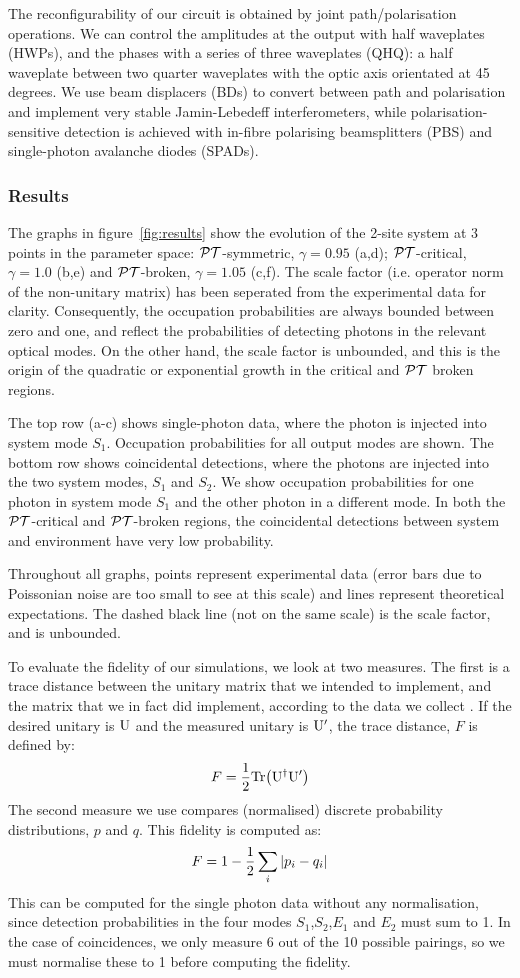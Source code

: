 The reconfigurability of our circuit is obtained by joint path/polarisation
operations. We can control the amplitudes at the output with half waveplates
(HWPs), and the phases with a series of three waveplates (QHQ): a half waveplate
between two quarter waveplates with the optic axis orientated at 45 degrees.
We use beam displacers (BDs) to convert between path and polarisation and
implement very stable Jamin-Lebedeff interferometers, while
polarisation-sensitive detection is achieved with in-fibre polarising
beamsplitters (PBS) and single-photon avalanche diodes (SPADs).

\subsubsection{Results}
The graphs in figure~\ref{fig:results} show the evolution of the 2-site system
at 3 points in the parameter space: \(\mathcal{PT}\)-symmetric, \(\gamma=0.95\) (a,d);
\(\mathcal{PT}\)-critical, \(\gamma=1.0\) (b,e) and \(\mathcal{PT}\)-broken, \(\gamma=1.05\)
(c,f). The scale factor (i.e. operator norm of the non-unitary matrix) has been
seperated from the experimental data for clarity. Consequently, the occupation
probabilities are always bounded between zero and one, and reflect the
probabilities of detecting photons in the relevant optical modes. On the other
hand, the scale factor is unbounded, and this is the origin of the quadratic or
exponential growth in the critical and \(\mathcal{PT}\) broken regions.

The top row (a-c) shows single-photon data, where the photon is injected into
system mode \(S_1\). Occupation probabilities for all output modes are shown.
The bottom row shows coincidental detections, where the photons are injected
into the two system modes, \(S_1\) and \(S_2\). We show occupation probabilities
for one photon in system mode \(S_1\) and the other photon in a different mode.
In both the \(\mathcal{PT}\)-critical and \(\mathcal{PT}\)-broken regions, the coincidental
detections between system and environment have very low probability.

Throughout all graphs, points represent experimental data (error bars due to
Poissonian noise are too small to see at this scale) and lines represent
theoretical expectations. The dashed black line (not on the same scale) is the
scale factor, and is unbounded.

To evaluate the fidelity of our simulations, we look at two measures. The first
is a trace distance between the unitary matrix that we intended to implement,
and the matrix that we in fact did implement, according to the data we collect
. If the desired unitary is \(\mathrm{U}\) and the measured unitary
is \(\mathrm{U^{\prime}}\), the trace distance, \(F\) is defined by:
\[F=\frac{1}{2}\mathrm{Tr}\!\left(\mathrm{U}^{\dagger}{\mathrm{U}^{\prime}}\right)\]
The second measure we use compares (normalised) discrete probability
distributions, \(p\) and \(q\). This fidelity is computed as:
\[F=1-\frac{1}{2}\sum_{i}\left|p_{i}-q_{i}\right|\]
This can be computed for the single photon data without any normalisation, since
detection probabilities in the four modes \(S_1\),\(S_2\),\(E_1\) and \(E_2\)
must sum to 1. In the case of coincidences, we only measure 6 out of the 10
possible pairings, so we must normalise these to 1 before computing the
fidelity.

